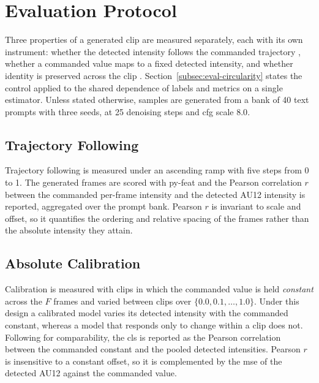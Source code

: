 \section{Evaluation Protocol}\label{sec:method-evaluation}

Three properties of a generated clip are measured separately, each with its own instrument:
whether the detected intensity follows the commanded trajectory
, whether a commanded value maps to a fixed detected
intensity, and whether identity is preserved across
the clip . Section~\ref{subsec:eval-circularity} states
the control applied to the shared dependence of labels and metrics on a single estimator.
Unless stated otherwise, samples are generated from a bank of 40 text prompts with three seeds, 
at 25 denoising steps and \gls{cfg} \citep{ho2022cfg} scale $8.0$.

\subsection{Trajectory Following}\label{subsec:eval-ramp}

Trajectory following is measured under an ascending ramp with five steps from 0 to 1. The
generated frames are scored with py-feat and the Pearson correlation $r$ between the
commanded per-frame intensity and the detected AU12 intensity is reported, aggregated over
the prompt bank. Pearson $r$ is invariant to scale and offset, so it quantifies the ordering 
and relative spacing of the frames rather than the absolute intensity they attain.

\subsection{Absolute Calibration}\label{subsec:eval-calibration}

Calibration is measured with clips in which the commanded value is held \emph{constant}
across the $F$ frames and varied between clips over $\{0.0, 0.1, \dots, 1.0\}$. Under this
design a calibrated model varies its detected intensity with the commanded constant,
whereas a model that responds only to change within a clip does not. Following
\citet{hua2026pixelsmile} for comparability, the \gls{cls} is reported as the Pearson
correlation between the commanded constant and the pooled detected intensities. Pearson $r$
is insensitive to a constant offset, so it is complemented by the \gls{mse} of the detected
AU12 against the commanded value.


